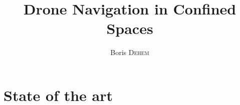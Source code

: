 \documentclass{eplmastersthesis}
\title{Drone Navigation in Confined Spaces}
\author{Boris \textsc{Dehem}}
\begin{document}









%

\chapter{State of the art}


%

%
\end{document}
